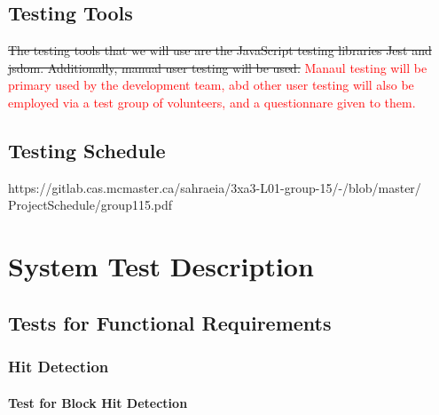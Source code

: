 \documentclass[12pt, titlepage]{article}
\begin{document}
\subsection{Testing Tools}
\sout{The testing tools that we will use are the JavaScript testing libraries Jest and jsdom. Additionally, manual user testing will be used.} \textcolor{red}{Manaul testing will be primary used by the development team, abd other user testing will also be employed via a test group of volunteers, and a questionnare given to them.}

\subsection{Testing Schedule}

https://gitlab.cas.mcmaster.ca/sahraeia/3xa3-L01-group-15/-/blob/master/\\ProjectSchedule/group115.pdf

\section{System Test Description}
	
\subsection{Tests for Functional Requirements}

\subsubsection{Hit Detection}
		
\paragraph{Test for Block Hit Detection}
\end{document}
